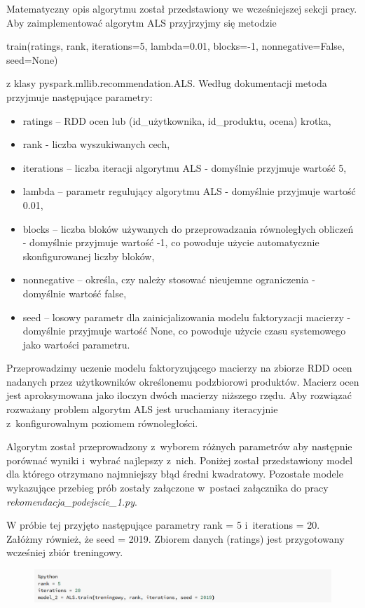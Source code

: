 \documentclass[12pt,a4paper]{report}
\begin{document}
Matematyczny opis algorytmu został przedstawiony we wcześniejszej sekcji pracy.
Aby zaimplementować algorytm ALS przyjrzyjmy się metodzie 
\begin{center}
train(ratings, rank, iterations=5, lambda=0.01, blocks=-1, nonnegative=False, seed=None)
\end{center}
z klasy pyspark.mllib.recommendation.ALS. Według dokumentacji metoda przyjmuje następujące parametry:
\begin{itemize}
\item ratings – RDD ocen lub (id\_użytkownika, id\_produktu, ocena) krotka,
\item rank - liczba wyszukiwanych cech,
\item iterations – liczba iteracji algorytmu ALS - domyślnie przyjmuje wartość 5,
\item lambda – parametr regulujący algorytmu ALS - domyślnie przyjmuje wartość 0.01,
\item blocks – liczba bloków używanych do przeprowadzania równoległych obliczeń - domyślnie przyjmuje wartość -1, co powoduje użycie automatycznie skonfigurowanej liczby bloków,
\item nonnegative – określa, czy należy stosować nieujemne ograniczenia - domyślnie wartość false,
\item seed – losowy parametr dla zainicjalizowania modelu faktoryzacji macierzy - domyślnie przyjmuje wartość None, co powoduje użycie czasu systemowego jako wartości parametru.
\end{itemize}

Przeprowadzimy uczenie modelu faktoryzującego macierzy na zbiorze RDD ocen nadanych przez użytkowników określonemu podzbiorowi produktów. Macierz ocen jest aproksymowana jako iloczyn dwóch macierzy niższego rzędu. Aby rozwiązać rozważany problem algorytm ALS jest uruchamiany iteracyjnie z~konfigurowalnym poziomem równoległości.

Algorytm został przeprowadzony z~wyborem różnych parametrów aby następnie porównać wyniki i~wybrać najlepszy z~nich.
Poniżej został przedstawiony model dla którego otrzymano najmniejszy błąd średni kwadratowy.
Pozostałe modele wykazujące przebieg prób zostały załączone w~postaci załącznika do pracy \textit{rekomendacja\_podejscie\_1.py}. 

W próbie tej przyjęto następujące parametry rank = 5 i~iterations = 20. Załóżmy również, że seed = 2019. Zbiorem danych (ratings) jest przygotowany wcześniej zbiór treningowy.

\begin{figure}[H]
\includegraphics[scale=0.5]{obrazy/ALS8.PNG} 
\end{figure}
\end{document}
